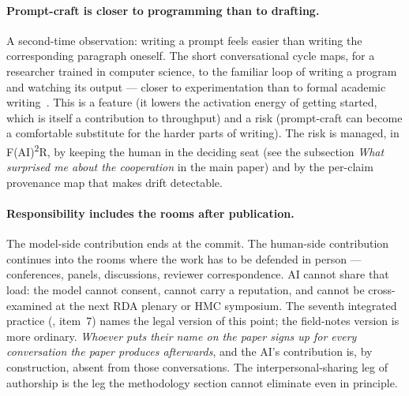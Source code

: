 \paragraph{Prompt-craft is closer to programming than to drafting.}
A second-time observation: writing a prompt feels easier than writing
the corresponding paragraph oneself. The short conversational cycle
maps, for a researcher trained in computer science, to the familiar
loop of writing a program and watching its output --- closer to
experimentation than to formal academic
writing~\cite{reynolds2021prompt,liu2023prompt}.
This is a feature (it lowers the activation energy of getting
started, which is itself a contribution to throughput) and a risk
(prompt-craft can become a comfortable substitute for the harder
parts of writing). The risk is managed, in
F(AI)\textsuperscript{2}R, by keeping the human in the deciding seat
(see the  subsection \emph{What surprised me about the
cooperation} in the main paper) and by the per-claim provenance map that makes drift
detectable.

\paragraph{Responsibility includes the rooms after publication.}
The model-side contribution ends at the commit. The human-side
contribution continues into the rooms where the work has to be
defended in person --- conferences, panels, discussions, reviewer
correspondence. AI cannot share that load: the model cannot consent,
cannot carry a reputation, and cannot be cross-examined at the next
RDA plenary or HMC symposium. The seventh integrated practice
(, item~7) names the legal version of this point;
the field-notes version is more ordinary. \emph{Whoever puts their
name on the paper signs up for every conversation the paper produces
afterwards}, and the AI's contribution is, by construction, absent
from those conversations. The interpersonal-sharing leg of authorship
is the leg the methodology section cannot eliminate even in
principle.
